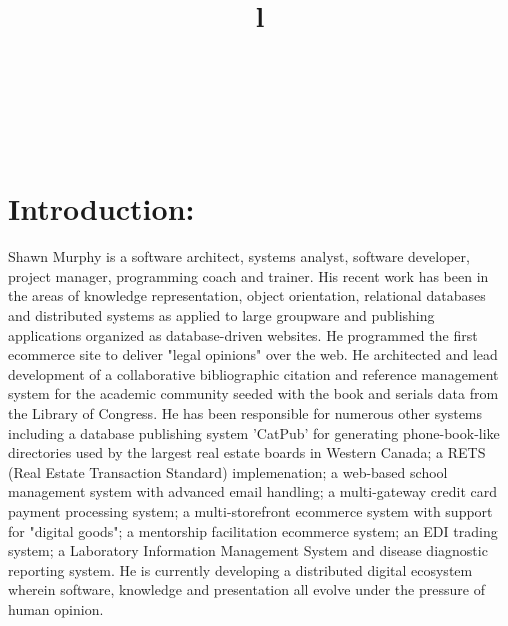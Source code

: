 \resumewidth=7in
\begin{resume}


\begin{format}
\title{l}\\
\\
\body\\
\end{format}


\section{Introduction:}
\begin{par}
Shawn Murphy is a software architect, systems analyst, 
software developer, project manager, programming coach and trainer.
His recent work has been in the areas of knowledge representation, 
object orientation, relational databases 
and distributed systems as applied to large groupware and
publishing applications organized as database-driven websites.  
He programmed the first ecommerce site to deliver 
"legal opinions" over the web.  
He architected and lead development of a collaborative 
bibliographic citation and
reference management system for the academic community seeded with
the book and serials data from the Library of Congress.  
He has been responsible for numerous other systems including
a database publishing system 'CatPub' for generating phone-book-like directories used by the largest real estate boards in Western Canada;
a RETS (Real Estate Transaction Standard) implemenation;
a web-based school management system with advanced email handling; 
a multi-gateway credit card payment processing system; 
a multi-storefront ecommerce system with support for "digital goods"; 
a mentorship facilitation ecommerce system; 
an EDI trading system; 
a Laboratory Information Management System and disease diagnostic
reporting system. He is currently developing a distributed digital ecosystem wherein software, knowledge and 
presentation all evolve under the pressure of human opinion.
\end{par}






\end{resume}
